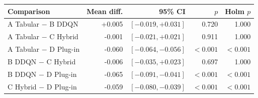 \begin{tabular}{@{}lrrrr@{}}
\toprule
Comparison & Mean diff. & 95\% CI & $p$ & Holm $p$ \\
\midrule
A Tabular $-$ B DDQN & +0.005 & $[-0.019,+0.031]$ & 0.720 & 1.000 \\
A Tabular $-$ C Hybrid & -0.001 & $[-0.021,+0.021]$ & 0.911 & 1.000 \\
A Tabular $-$ D Plug-in & -0.060 & $[-0.064,-0.056]$ & $<0.001$ & $<0.001$ \\
B DDQN $-$ C Hybrid & -0.006 & $[-0.035,+0.023]$ & 0.697 & 1.000 \\
B DDQN $-$ D Plug-in & -0.065 & $[-0.091,-0.041]$ & $<0.001$ & $<0.001$ \\
C Hybrid $-$ D Plug-in & -0.059 & $[-0.080,-0.039]$ & $<0.001$ & $<0.001$ \\
\bottomrule
\end{tabular}
